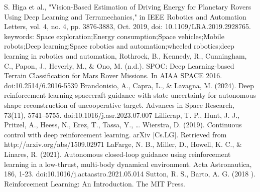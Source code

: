 \documentclass[conference]{IEEEtran}
\begin{document}
\begin{thebibliography}{00}
 S. Higa et al., "Vision-Based Estimation of Driving Energy for Planetary Rovers Using Deep Learning and Terramechanics," in IEEE Robotics and Automation Letters, vol. 4, no. 4, pp. 3876-3883, Oct. 2019, doi: 10.1109/LRA.2019.2928765.
keywords: {Space exploration;Energy consumption;Space vehicles;Mobile robots;Deep learning;Space robotics and automation;wheeled robotics;deep learning in robotics and automation},
 Rothrock, B., Kennedy, R., Cunningham, C., Papon, J., Heverly, M., \& Ono, M. (n.d.). SPOC: Deep Learning-based Terrain Classification for Mars Rover Missions. In AIAA SPACE 2016. doi:10.2514/6.2016-5539
 Brandonisio, A., Capra, L., \& Lavagna, M. (2024). Deep reinforcement learning spacecraft guidance with state uncertainty for autonomous shape reconstruction of uncooperative target. Advances in Space Research, 73(11), 5741–5755. doi:10.1016/j.asr.2023.07.007
 Lillicrap, T. P., Hunt, J. J., Pritzel, A., Heess, N., Erez, T., Tassa, Y., … Wierstra, D. (2019). Continuous control with deep reinforcement learning. arXiv [Cs.LG]. Retrieved from http://arxiv.org/abs/1509.02971
 LaFarge, N. B., Miller, D., Howell, K. C., \& Linares, R. (2021). Autonomous closed-loop guidance using reinforcement learning in a low-thrust, multi-body dynamical environment. Acta Astronautica, 186, 1-23. doi:10.1016/j.actaastro.2021.05.014
 Sutton, R. S., Barto, A. G. (2018 ). Reinforcement Learning: An Introduction. The MIT Press.
\end{thebibliography}
\end{document}
